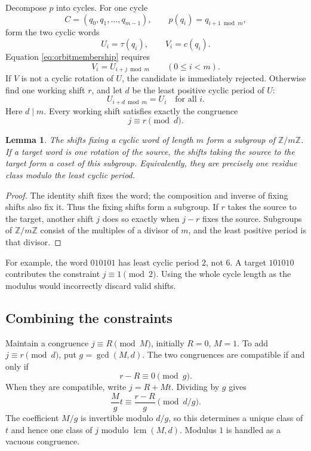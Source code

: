 \documentclass[11pt,a4paper]{article}
\numberwithin{equation}{section}
\newtheorem{lemma}[theorem]{Lemma}
\theoremstyle{definition}
\theoremstyle{remark}
\newcommand{\Z}{\mathbb Z}
\newcommand{\lcm}{\operatorname{lcm}}
\begin{document}
Decompose $p$ into cycles. For one cycle
\[
 C=(q_0,q_1,\ldots,q_{m-1}),\qquad p(q_i)=q_{i+1\bmod m},
\]
form the two cyclic words
\[
 U_i=\tau(q_i),\qquad V_i=c(q_i).
\]
Equation \eqref{eq:orbitmembership} requires
\[
 V_i=U_{i+j\bmod m}\qquad(0\le i<m).
\]
If $V$ is not a cyclic rotation of $U$, the candidate is immediately rejected.
Otherwise find one working shift $r$, and let $d$ be the least positive
cyclic period of $U$:
\[
 U_{i+d\bmod m}=U_i\quad\text{for all }i.
\]
Here $d\mid m$. Every working shift satisfies exactly the congruence
\begin{equation}\label{eq:shiftcongruence}
 j\equiv r\pmod d.
\end{equation}

\begin{lemma}\label{lem:shiftcoset}
The shifts fixing a cyclic word of length $m$ form a subgroup of
$\Z/m\Z$. If a target word is one rotation of the source, the shifts taking
the source to the target form a coset of this subgroup. Equivalently, they
are precisely one residue class modulo the least cyclic period.
\end{lemma}
\begin{proof}
The identity shift fixes the word; the composition and inverse of fixing
shifts also fix it. Thus the fixing shifts form a subgroup. If $r$ takes the
source to the target, another shift $j$ does so exactly when $j-r$ fixes the
source. Subgroups of $\Z/m\Z$ consist of the multiples of a divisor of $m$,
and the least positive period is that divisor.
\end{proof}

For example, the word $010101$ has least cyclic period $2$, not $6$.
A target $101010$ contributes the constraint $j\equiv1\pmod2$. Using the
whole cycle length as the modulus would incorrectly discard valid shifts.

\subsection{Combining the constraints}

Maintain a congruence $j\equiv R\pmod M$, initially $R=0$, $M=1$.
To add $j\equiv r\pmod d$, put $g=\gcd(M,d)$. The two congruences are
compatible if and only if
\[
 r-R\equiv0\pmod g.
\]
When they are compatible, write $j=R+Mt$. Dividing by $g$ gives
\[
 \frac{M}{g}t\equiv\frac{r-R}{g}\pmod{d/g}.
\]
The coefficient $M/g$ is invertible modulo $d/g$, so this determines a unique
class of $t$ and hence one class of $j$ modulo $\lcm(M,d)$. Modulus $1$ is
handled as a vacuous congruence.
\end{document}
